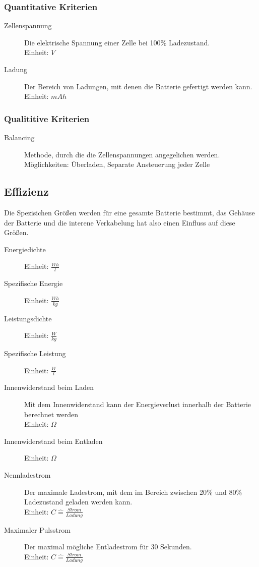 \subsubsection{Quantitative Kriterien}
\begin{description}
	\item[Zellenspannung] Die elektrische Spannung einer Zelle bei 100\% Ladezustand.\\
	Einheit: $V$
	\item[Ladung] Der Bereich von Ladungen, mit denen die Batterie gefertigt werden kann.\\
	Einheit: $mAh$ 	
\end{description}

\subsubsection{Qualititive Kriterien}
\begin{description}
	\item[Balancing] Methode, durch die die Zellenspannungen angegelichen werden.\\
	Möglichkeiten: Überladen, Separate Ansteuerung jeder Zelle
\end{description}

\subsection{Effizienz}
Die Spezisichen Größen werden für eine gesamte Batterie bestimmt, das Gehäuse der Batterie und die interene Verkabelung hat also einen Einfluss auf diese Größen.
\begin{description}
	\item[Energiedichte] Einheit: $\frac{Wh}{l}$  
	\item[Spezifische Energie] Einheit: $\frac{Wh}{kg}$
	\item[Leistungsdichte] Einheit: $\frac{W}{kg}$
	\item[Spezifische Leistung] Einheit: $\frac{W}{l}$
	\item[Innenwiderstand beim Laden] Mit dem Innenwiderstand kann der Energieverlust innerhalb der Batterie berechnet werden\\
	Einheit: $\Omega$ 
	\item[Innenwiderstand beim Entladen] Einheit: $\Omega$
	\item[Nennladestrom] Der maximale Ladestrom, mit dem im Bereich zwischen 20\% und 80\% Ladezustand geladen werden kann.\\
	Einheit: $C\hat{=} \frac{Strom}{Ladung}$
	\item[Maximaler Pulsstrom] Der maximal mögliche Entladestrom für 30 Sekunden.\\
	Einheit: $C\hat{=} \frac{Strom}{Ladung}$
\end{description}

